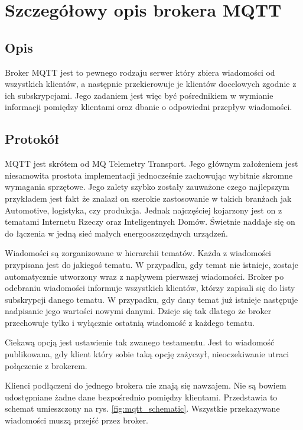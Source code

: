 \chapter{Szczegółowy opis brokera MQTT}
    \section{Opis}
        Broker MQTT jest to pewnego rodzaju serwer który zbiera wiadomości od wszystkich klientów, a następnie przekierowuje je klientów docelowych zgodnie z ich subskrypcjami. Jego zadaniem jest więc być pośrednikiem w wymianie informacji pomiędzy klientami oraz dbanie o odpowiedni przepływ wiadomości. 
        
    \section{Protokół}
        MQTT jest skrótem od MQ Telemetry Transport. Jego głównym założeniem jest niesamowita prostota implementacji jednocześnie zachowując wybitnie skromne wymagania sprzętowe. Jego zalety szybko zostały zauważone czego najlepszym przykładem jest fakt że znalazł on szerokie zastosowanie w takich branżach jak Automotive, logistyka, czy produkcja. Jednak najczęściej kojarzony jest on z tematami Internetu Rzeczy oraz Inteligentnych Domów. Świetnie naddaje się on do łączenia w jedną sieć małych energooszczędnych urządzeń. 
        
        Wiadomości są zorganizowane w hierarchii tematów. Każda z wiadomości przypisana jest do jakiegoś tematu. W przypadku, gdy temat nie istnieje, zostaje automatycznie utworzony wraz z napływem pierwszej wiadomości. Broker po odebraniu wiadomości informuje wszystkich klientów, którzy zapisali się do listy subskrypcji danego tematu. W przypadku, gdy dany temat już istnieje następuje nadpisanie jego wartości nowymi danymi. Dzieje się tak dlatego że broker przechowuje tylko i wyłącznie ostatnią wiadomość z każdego tematu.
        
        Ciekawą opcją jest ustawienie tak zwanego testamentu. Jest to wiadomość publikowana, gdy klient który sobie taką opcję zażyczył, nieoczekiwanie utraci połączenie z brokerem.
        
        Klienci podłączeni do jednego brokera nie znają się nawzajem. Nie są bowiem udostępniane żadne dane bezpośrednio pomiędzy klientami. Przedstawia to schemat umieszczony na rys. \ref{fig:mqtt_schematic}.
        Wszystkie przekazywane wiadomości muszą przejść przez broker. 
        
